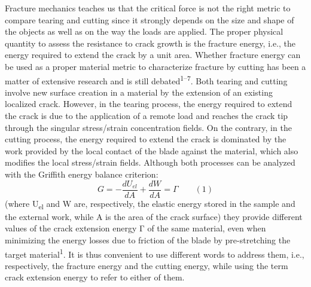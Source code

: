 \documentclass{article}
\begin{document}
Fracture mechanics teaches us that the critical force is not the right metric to compare tearing and cutting since it strongly depends on the size and shape of the objects as well as on the way the loads are applied. The proper physical quantity to assess the resistance to crack growth is the fracture energy, i.e., the energy required to extend the crack by a unit area. Whether fracture energy can be used as a proper material metric to characterize fracture by cutting has been a matter of extensive research and is still debated\textsuperscript{1–7}. Both tearing and cutting involve new surface creation in a material by the extension of an existing localized crack. However, in the tearing process, the energy required to extend the crack is due to the application of a remote load and reaches the crack tip through the singular stress/strain concentration fields. On the contrary, in the cutting process, the energy required to extend the crack is dominated by the work provided by the local contact of the blade against the material, which also modifies the local stress/strain fields. Although both processes can be analyzed with the Griffith energy balance criterion:
\[ G = -\frac{dU_{el}}{dA} + \frac{dW}{dA} = \Gamma \qquad (1) \]
(where U\textsubscript{el} and W are, respectively, the elastic energy stored in the sample and the external work, while A is the area of the crack surface) they provide different values of the crack extension energy Γ of the same material, even when minimizing the energy losses due to friction of the blade by pre-stretching the target material\textsuperscript{1}. It is thus convenient to use different words to address them, i.e., respectively, the fracture energy and the cutting energy, while using the term crack extension energy to refer to either of them.
\end{document}
